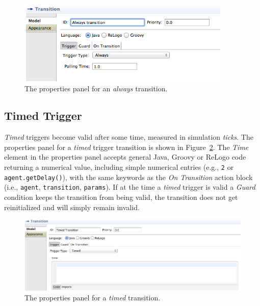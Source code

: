 \documentclass[11pt]{amsart}
\begin{document}
\begin{figure}
\begin{center}
\vspace{.2in}
\centerline {
\includegraphics[width=4in]{StatechartsImages/AlwaysTransitionProperties.png}
}
\caption{The properties panel for an \emph{always} transition.}
\label{fig:alwaysTransitionProperties}
\end{center}
\end{figure}
\clearpage

\subsection{Timed Trigger}
\label{sec:timedTransition}
\emph{Timed} triggers become valid after some time, measured in simulation \emph{ticks}. The properties panel for a \emph{timed} trigger transition is shown in Figure~\ref{fig:timedTransitionProperties}. The \emph{Time} element in the properties panel accepts general Java, Groovy or ReLogo code returning a numerical value, including simple numerical entries (e.g., \texttt{2} or \texttt{agent.getDelay()}), with the same keywords as the \emph{On Transition} action block (i.e., \texttt{agent}, \texttt{transition}, \texttt{params}). If at the time a \emph{timed} trigger is valid a \emph{Guard} condition keeps the transition from being valid, the transition does not get reinitialized and will simply remain invalid.

\begin{figure}
\begin{center}
\vspace{.2in}
\centerline {
\includegraphics[width=5in]{StatechartsImages/TimedTransitionProperties.png}
}
\caption{The properties panel for a \emph{timed} transition.}
\label{fig:timedTransitionProperties}
\end{center}
\end{figure}
\clearpage
\end{document}

